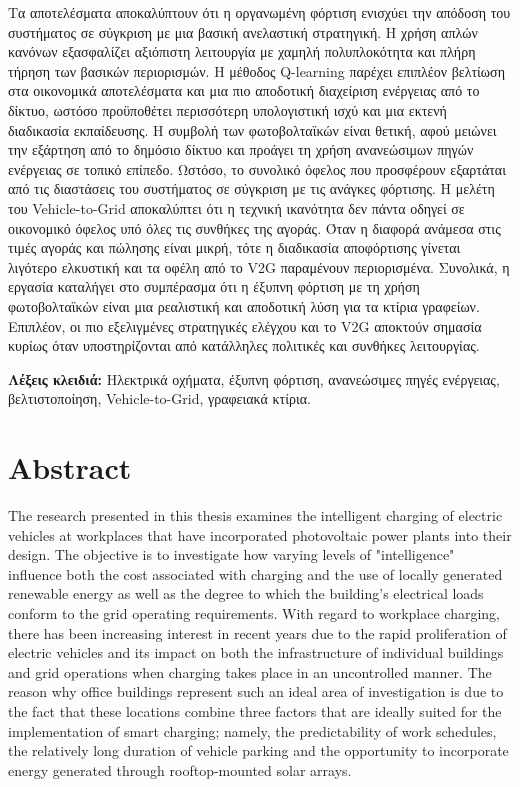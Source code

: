 \begin{greekabstract}
Τα αποτελέσματα αποκαλύπτουν ότι η οργανωμένη φόρτιση ενισχύει την απόδοση του συστήματος σε σύγκριση με μια βασική ανελαστική στρατηγική. Η χρήση απλών κανόνων εξασφαλίζει αξιόπιστη λειτουργία με χαμηλή πολυπλοκότητα και πλήρη τήρηση των βασικών περιορισμών. Η μέθοδος Q-learning παρέχει επιπλέον βελτίωση στα οικονομικά αποτελέσματα και μια πιο αποδοτική διαχείριση ενέργειας από το δίκτυο, ωστόσο προϋποθέτει περισσότερη υπολογιστική ισχύ και μια εκτενή διαδικασία εκπαίδευσης. Η συμβολή των φωτοβολταϊκών είναι θετική, αφού μειώνει την εξάρτηση από το δημόσιο δίκτυο και προάγει τη χρήση ανανεώσιμων πηγών ενέργειας σε τοπικό επίπεδο. Ωστόσο, το συνολικό όφελος που προσφέρουν εξαρτάται από τις διαστάσεις του συστήματος σε σύγκριση με τις ανάγκες φόρτισης. Η μελέτη του Vehicle-to-Grid αποκαλύπτει ότι η τεχνική ικανότητα δεν πάντα οδηγεί σε οικονομικό όφελος υπό όλες τις συνθήκες της αγοράς. Όταν η διαφορά ανάμεσα στις τιμές αγοράς και πώλησης είναι μικρή, τότε η διαδικασία αποφόρτισης γίνεται λιγότερο ελκυστική και τα οφέλη από το V2G παραμένουν περιορισμένα. Συνολικά, η εργασία καταλήγει στο συμπέρασμα ότι η έξυπνη φόρτιση με τη χρήση φωτοβολταϊκών είναι μια ρεαλιστική και αποδοτική λύση για τα κτίρια γραφείων. Επιπλέον, οι πιο εξελιγμένες στρατηγικές ελέγχου και το V2G αποκτούν σημασία κυρίως όταν υποστηρίζονται από κατάλληλες πολιτικές και συνθήκες λειτουργίας.

\textbf{Λέξεις κλειδιά:} Ηλεκτρικά οχήματα, έξυπνη φόρτιση, ανανεώσιμες πηγές ενέργειας, βελτιστοποίηση, Vehicle-to-Grid, γραφειακά κτίρια.

\end{greekabstract}

\newpage

\chapter*{Abstract}

The research presented in this thesis examines the intelligent charging of electric vehicles at workplaces that have incorporated photovoltaic power plants into their design. The objective is to investigate how varying levels of "intelligence" influence both the cost associated with charging and the use of locally generated renewable energy as well as the degree to which the building’s electrical loads conform to the grid operating requirements. With regard to workplace charging, there has been increasing interest in recent years due to the rapid proliferation of electric vehicles and its impact on both the infrastructure of individual buildings and grid operations when charging takes place in an uncontrolled manner. The reason why office buildings represent such an ideal area of investigation is due to the fact that these locations combine three factors that are ideally suited for the implementation of smart charging; namely, the predictability of work schedules, the relatively long duration of vehicle parking and the opportunity to incorporate energy generated through rooftop-mounted solar arrays.

